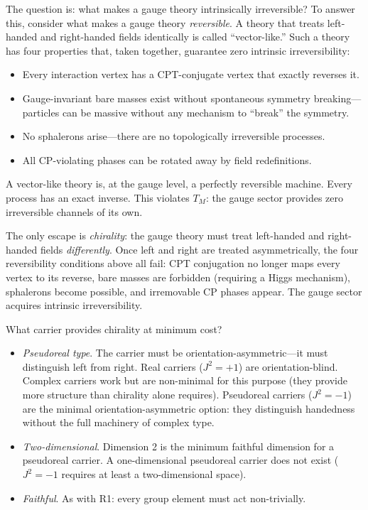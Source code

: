 \documentclass[11pt]{article}
\newenvironment{varlist}{\begin{itemize}[nosep,leftmargin=2em]}{\end{itemize}}
\begin{document}
The question is: what makes a gauge theory intrinsically irreversible?  To answer this, consider what makes a gauge theory \emph{reversible}.  A theory that treats left-handed and right-handed fields identically is called ``vector-like.''  Such a theory has four properties that, taken together, guarantee zero intrinsic irreversibility:

\begin{varlist}
\item Every interaction vertex has a CPT-conjugate vertex that exactly reverses it.
\item Gauge-invariant bare masses exist without spontaneous symmetry breaking---particles can be massive without any mechanism to ``break'' the symmetry.
\item No sphalerons arise---there are no topologically irreversible processes.
\item All CP-violating phases can be rotated away by field redefinitions.
\end{varlist}

\noindent A vector-like theory is, at the gauge level, a perfectly reversible machine.  Every process has an exact inverse.  This violates $T_M$: the gauge sector provides zero irreversible channels of its own.

The only escape is \emph{chirality}: the gauge theory must treat left-handed and right-handed fields \emph{differently}.  Once left and right are treated asymmetrically, the four reversibility conditions above all fail: CPT conjugation no longer maps every vertex to its reverse, bare masses are forbidden (requiring a Higgs mechanism), sphalerons become possible, and irremovable CP phases appear.  The gauge sector acquires intrinsic irreversibility.

What carrier provides chirality at minimum cost?

\begin{varlist}
\item \textit{Pseudoreal type}.  The carrier must be orientation-asymmetric---it must distinguish left from right.  Real carriers ($J^2 = +1$) are orientation-blind.  Complex carriers work but are non-minimal for this purpose (they provide more structure than chirality alone requires).  Pseudoreal carriers ($J^2 = -1$) are the minimal orientation-asymmetric option: they distinguish handedness without the full machinery of complex type.
\item \textit{Two-dimensional}.  Dimension 2 is the minimum faithful dimension for a pseudoreal carrier.  A one-dimensional pseudoreal carrier does not exist ($J^2 = -1$ requires at least a two-dimensional space).
\item \textit{Faithful}.  As with R1: every group element must act non-trivially.
\end{varlist}
\end{document}
